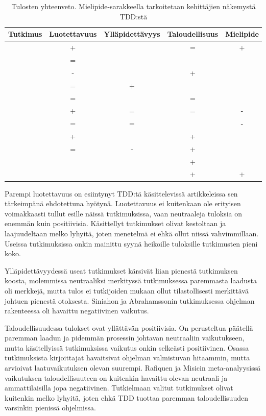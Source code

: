 \documentclass[finnish]{tktltiki2}
\theoremstyle{definition}
\theoremstyle{remark}
\begin{document}
\begin{table}
\begin{tabular}{ l  c  c  c  c}
\toprule
  Tutkimus & Luotettavuus & Ylläpidettävyys & Taloudellisuus & Mielipide \\
\midrule
\cite{George04} 	& + &  & = & + \\ 
\cite{Wilkerson12} 	& = &  &   &   \\ 
\cite{Erdogmus05} 	& - &  	& + &   \\ 
\cite{Causevic12} 	& = & + &   &   \\
\cite{Canfora06} 	& = &  & = &   \\ 
\cite{Pancur11} 	& + & = & = & - \\
\cite{Munir14} 	& = & = &   & - \\ 
\cite{Nagappan08} 	& + &  & + &   \\ 
\cite{Siniaalto07} 	& = & - & + &   \\ 
\cite{Madeyski07} 	&   &   & + &   \\ 
\cite{Latorre14}	&   &   & + & + \\ 
\bottomrule
\end{tabular}
\caption{Tulosten yhteenveto. Mielipide-sarakkeella tarkoitetaan kehittäjien näkemystä TDD:stä}
\end{table}


Parempi luotettavuus on esiintynyt TDD:tä käsittelevissä artikkeleissa sen tärkeimpänä ehdotettuna hyötynä. Luotettavuus ei kuitenkaan ole erityisen voimakkaasti tullut esille näissä tutkimuksissa, vaan neutraaleja tuloksia on enemmän kuin positiivisia. Käsittellyt tutkimukset olivat  kestoltaan ja laajuudeltaan melko lyhyitä, joten menetelmä ei ehkä ollut niissä vahvimmillaan. Useissa tutkimuksissa onkin mainittu syynä heikoille tuloksille tutkimusten pieni koko. 

Ylläpidettävyydessä useat tutkimukset kärsivät liian pienestä tutkimuksen koosta, molemmissa neutraaliksi merkityssä tutkimuksessa paremmasta laadusta oli merkkejä, mutta tulos ei tutkijoiden mukaan ollut tilastollisesti merkittävä johtuen pienestä otoksesta. Siniahon ja Abrahamssonin tutkimuksessa ohjelman rakenteessa oli havaittu negatiivinen vaikutus.

Taloudellisuudessa tulokset ovat yllättävän positiivisia. On perusteltua päätellä paremman laadun ja pidemmän prosessin johtavan neutraaliin vaikutukseen, mutta käsitellyissä tutkimuksissa vaikutus onkin selkeästi positiivinen. Osassa tutkimuksista kirjoittajat havaitsivat ohjelman valmistuvan hitaammin, mutta arvioivat laatuvaikutuksen olevan suurempi. Rafiquen ja Misicin meta-analyysissä vaikutuksen taloudellisuuteen on kuitenkin havaittu olevan neutraali ja ammattilaisilla jopa negatiivinen. Tutkielmaan valitut tutkimukset olivat kuitenkin melko lyhyitä, joten ehkä TDD tuottaa paremman taloudellisuuden varsinkin pienissä ohjelmissa.
\end{document}
